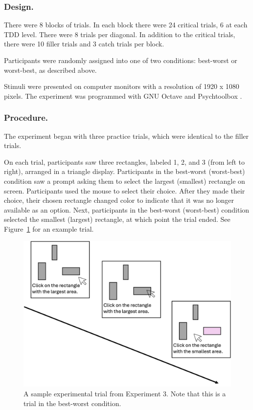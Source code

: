 \subsubsection{Design.}
There were 8 blocks of trials. In each block there were 24 critical trials, 6 at each TDD level. There were 8 trials per diagonal. In addition to the critical trials, there were 10 filler trials and 3 catch trials per block.

Participants were randomly assigned into one of two conditions: best-worst or worst-best, as described above. 

Stimuli were presented on computer monitors with a resolution of 1920 x 1080 pixels. The experiment was programmed with GNU Octave and Psychtoolbox \parencite{octave,brainardPsychophysicsToolbox1997}. 

\subsubsection{Procedure.}

The experiment began with three practice trials, which were identical to the filler trials. 

On each trial, participants saw three rectangles, labeled 1, 2, and 3 (from left to right), arranged in a triangle display. Participants in the best-worst (worst-best) condition saw a prompt asking them to select the largest (smallest) rectangle on screen. Participants used the mouse to select their choice. After they made their choice, their chosen rectangle changed color to indicate that it was no longer available as an option. Next, participants in the best-worst (worst-best) condition selected the smallest (largest) rectangle, at which point the trial ended. See Figure~\ref{fig:bw_example_trial} for an example trial.

\begin{figure}
   \includegraphics[width=\linewidth]{figures/bw_design_fig.jpg}
   \caption{A sample experimental trial from Experiment 3. Note that this is a trial in the best-worst condition.}
   \label{fig:bw_example_trial}
 \end{figure}
 
